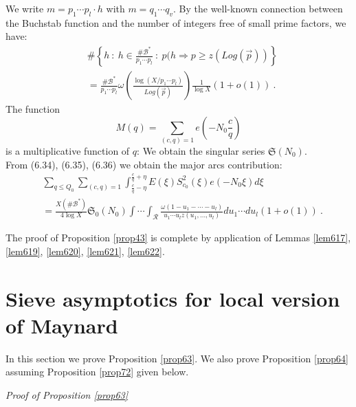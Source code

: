 \documentclass{amsart}
\numberwithin{equation}{subsection}
\begin{document}
We write $m=p_1\cdots p_l\cdot h$ with $m=q_1\cdots q_v$. By the well-known connection between the Buchstab function and the number of integers free of small prime factors, we have:
\begin{align*}
&\#\left\{ h\::\: h\in \frac{\# \mathcal{B}^*}{p_1\cdots p_l}\::\: p(h\Rightarrow p\geq z(Log(\vec{p}))\right\} \tag{6.36}\\
&=\frac{\# \mathcal{B}^*}{p_1\cdots p_l} \omega\left( \frac{\log (X/p_1\cdots p_l)}{Log(\vec{p})}\right) \frac{1}{\log X} (1+o(1))\:.
\end{align*}
The function
$$M(q)=\sum_{(c, q)=1}e\left(-N_0\frac{c}{q}\right)$$
is a multiplicative function of $q$: We obtain the singular series $\mathfrak{S}(N_0)$.\\
From (6.34), (6.35), (6.36) we obtain the major arcs contribution:
\begin{align*}
&\sum_{q\leq Q_0} \sum_{(c, q)=1} \int_{\frac{c}{q}-\eta}^{\frac{c}{q}+\eta} E(\xi)S_{c_0}^2(\xi) e(-N_0\xi)d\xi\\
&= \frac{X(\# \mathcal{B}^*)}{4\log X} \mathfrak{S}_0(N_0) \int\cdots\int_\mathcal{R} \frac{\omega(1-u_1-\cdots - u_l)}{u_1\cdots u_l z(u_1, \ldots, u_l)} du_1\cdots du_l (1+o(1))\:.
\end{align*}

The proof of Proposition \ref{prop43} is complete by application of Lemmas \ref{lem617}, \ref{lem619}, \ref{lem620}, \ref{lem621}, \ref{lem622}.

%


\section{Sieve asymptotics for local version of Maynard}

In this section we prove Proposition \ref{prop63}. We also prove Proposition \ref{prop64} assuming Proposition \ref{prop72} given below.

\textit{Proof of Proposition \ref{prop63}}
\end{document}

